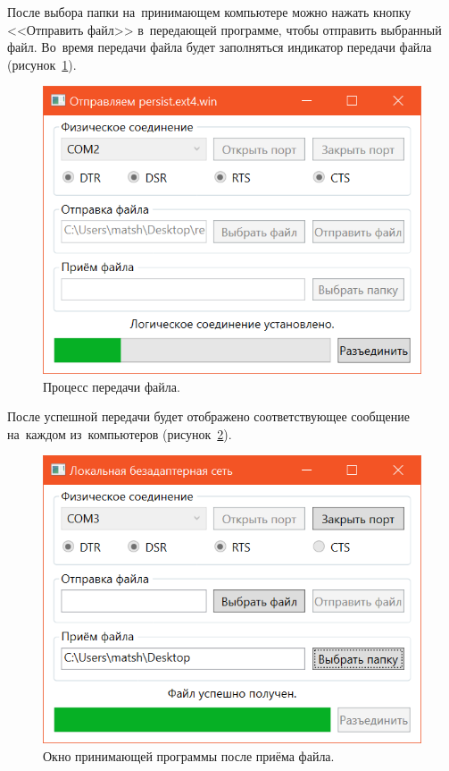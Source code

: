 \documentclass[a4paper,12pt]{article}
\begin{document}
После выбора папки на~принимающем компьютере можно нажать кнопку <<Отправить файл>> в~передающей программе, чтобы отправить выбранный файл. Во~время передачи файла будет заполняться индикатор передачи файла (рисунок~\ref{progress}).
\begin{figure}
\centering
\includegraphics{progress.png}
\caption{Процесс передачи файла.}\label{progress}
\end{figure}

После успешной передачи будет отображено соответствующее сообщение на~каждом из~компьютеров (рисунок~\ref{fin}).
\begin{figure}
\centering
\includegraphics{fin.png}
\caption{Окно принимающей программы после приёма файла.}\label{fin}
\end{figure}
\end{document}
